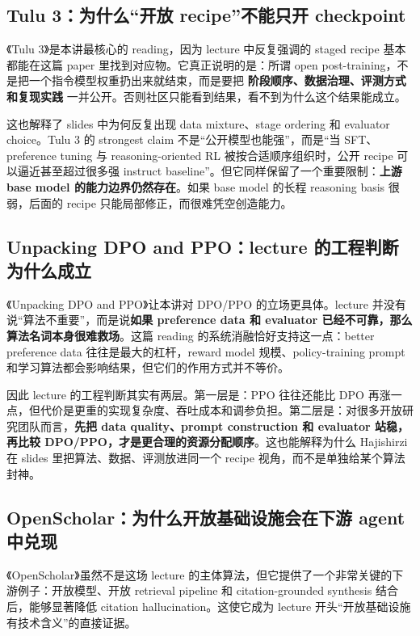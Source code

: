 \documentclass[a4paper]{article}
\begin{document}
\subsection{Tulu 3：为什么“开放 recipe”不能只开 checkpoint}

《Tulu 3》是本讲最核心的 reading，因为 lecture 中反复强调的 staged recipe 基本都能在这篇 paper 里找到对应物。它真正说明的是：所谓 open post-training，不是把一个指令模型权重扔出来就结束，而是要把 \textbf{阶段顺序、数据治理、评测方式和复现实践} 一并公开。否则社区只能看到结果，看不到为什么这个结果能成立。

这也解释了 slides 中为何反复出现 data mixture、stage ordering 和 evaluator choice。Tulu 3 的 strongest claim 不是“公开模型也能强”，而是“当 SFT、preference tuning 与 reasoning-oriented RL 被按合适顺序组织时，公开 recipe 可以逼近甚至超过很多强 instruct baseline”。但它同样保留了一个重要限制：\textbf{上游 base model 的能力边界仍然存在}。如果 base model 的长程 reasoning basis 很弱，后面的 recipe 只能局部修正，而很难凭空创造能力。

\subsection{Unpacking DPO and PPO：lecture 的工程判断为什么成立}

《Unpacking DPO and PPO》让本讲对 DPO/PPO 的立场更具体。lecture 并没有说“算法不重要”，而是说\textbf{如果 preference data 和 evaluator 已经不可靠，那么算法名词本身很难救场}。这篇 reading 的系统消融恰好支持这一点：better preference data 往往是最大的杠杆，reward model 规模、policy-training prompt 和学习算法都会影响结果，但它们的作用方式并不等价。

因此 lecture 的工程判断其实有两层。第一层是：PPO 往往还能比 DPO 再涨一点，但代价是更重的实现复杂度、吞吐成本和调参负担。第二层是：对很多开放研究团队而言，\textbf{先把 data quality、prompt construction 和 evaluator 站稳，再比较 DPO/PPO，才是更合理的资源分配顺序}。这也能解释为什么 Hajishirzi 在 slides 里把算法、数据、评测放进同一个 recipe 视角，而不是单独给某个算法封神。

\subsection{OpenScholar：为什么开放基础设施会在下游 agent 中兑现}

《OpenScholar》虽然不是这场 lecture 的主体算法，但它提供了一个非常关键的下游例子：开放模型、开放 retrieval pipeline 和 citation-grounded synthesis 结合后，能够显著降低 citation hallucination。这使它成为 lecture 开头“开放基础设施有技术含义”的直接证据。
\end{document}
